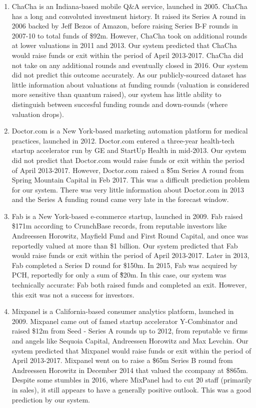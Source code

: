 \documentclass[../thesis/thesis.tex]{subfiles}
\begin{document}
\begin{enumerate}

\item ChaCha is an Indiana-based mobile Q\&A service, launched in 2005. ChaCha has a long and convoluted investment history. It raised its Series A round in 2006 backed by Jeff Bezos of Amazon, before raising Series B-F rounds in 2007-10 to total funds of \$92m. However, ChaCha took on additional rounds at lower valuations in 2011 and 2013. Our system predicted that ChaCha would raise funds or exit within the period of April 2013-2017. ChaCha did not take on any additional rounds and eventually closed in 2016. Our system did not predict this outcome accurately. As our publicly-sourced dataset has little information about valuations at funding rounds (valuation is considered more sensitive than quantum raised), our system has little ability to distinguish between succesful funding rounds and down-rounds (where valuation drops).

\item Doctor.com is a New York-based marketing automation platform for medical practices, launched in 2012. Doctor.com entered a three-year health-tech startup accelerator run by GE and StartUp Health in mid-2013. Our system did not predict that Doctor.com would raise funds or exit within the period of April 2013-2017. However, Doctor.com raised a \$5m Series A round from Spring Mountain Capital in Feb 2017. This was a difficult prediction problem for our system. There was very little information about Doctor.com in 2013 and the Series A funding round came very late in the forecast window.

\item Fab is a New York-based e-commerce startup, launched in 2009. Fab raised \$171m according to CrunchBase records, from reputable investors like Andreessen Horowitz, Mayfield Fund and First Round Capital, and once was reportedly valued at more than \$1 billion. Our system predicted that Fab would raise funds or exit within the period of April 2013-2017. Later in 2013, Fab completed a Series D round for \$150m. In 2015, Fab was acquired by PCH, reportedly for only a sum of \~\$20m. In this case, our system was technically accurate: Fab both raised funds and completed an exit. However, this exit was not a success for investors.

\item Mixpanel is a California-based consumer analytics platform, launched in 2009. Mixpanel came out of famed startup accelerator Y-Combinator and raised \$12m from Seed - Series A rounds up to 2012, from reputable \gls{vc} firms and angels like Sequoia Capital, Andreessen Horowitz and Max Levchin. Our system predicted that Mixpanel would raise funds or exit within the period of April 2013-2017.  Mixpanel went on to raise a \$65m Series B round from Andreessen Horowitz in December 2014 that valued the ccompany at \$865m. Despite some stumbles in 2016, where MixPanel had to cut 20 staff (primarily in sales), it still appears to have a generally positive outlook. This was a good prediction by our system.


\end{enumerate}
\end{document}
